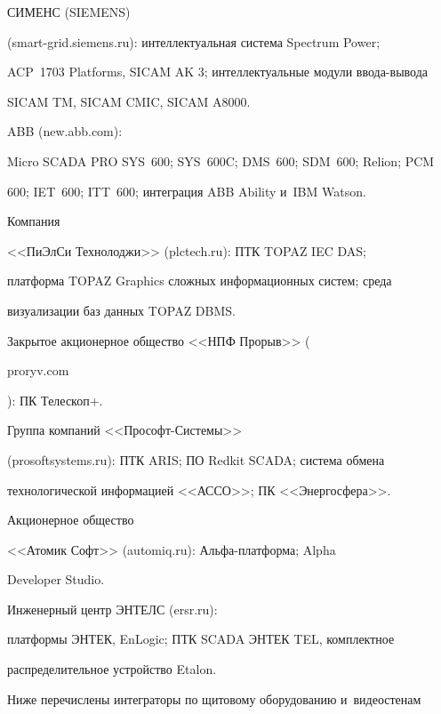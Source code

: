 СИМЕНС (SIEMENS)  


({\small {\sf smart-grid.siemens.ru}}): интеллектуальная система Spectrum Power; 


ACP~1703 Platforms, SICAM AK 3; интеллектуальные модули ввода-вывода 


SICAM TM, SICAM CMIC, SICAM A8000. 





ABB ({\small {\sf new.abb.com}}): 


Micro SCADA PRO SYS~600; SYS~600C; DMS~600; SDM~600; Relion; PCM 


600; IET~600; ITT~600; интеграция ABB Ability и~IBM Watson. 





Компания 


<<ПиЭлСи Технолоджи>> ({\small {\sf plctech.ru}}): ПТК TOPAZ IEC DAS; 


платформа TOPAZ Graphics сложных информационных систем; среда 


визуализации баз данных TOPAZ DBMS. 





Закрытое акционерное общество <<НПФ Прорыв>> ({\small {\sf 


proryv.com}}): ПК Телескоп+. 





Группа компаний <<Про\-софт-Сис\-те\-мы>> 


(prosoftsystems.ru): ПТК ARIS; ПО Redkit SCADA; система обмена 


технологической информацией <<\mbox{АССО}>>; ПК <<Энергосфера>>. 





Акционерное общество 


<<Атомик Софт>> ({\small {\sf automiq.ru}}): Аль\-фа-плат\-фор\-ма; Alpha 


Developer Studio. 





Инженерный центр ЭНТЕЛС ({\small{\sf ersr.ru}}): 


платформы ЭНТЕК, EnLogic; ПТК SCADA ЭНТЕК TEL, комплектное 


распределительное устройство Etalon.


  


  Ниже перечислены интеграторы по щитовому оборудованию и~видеостенам 


